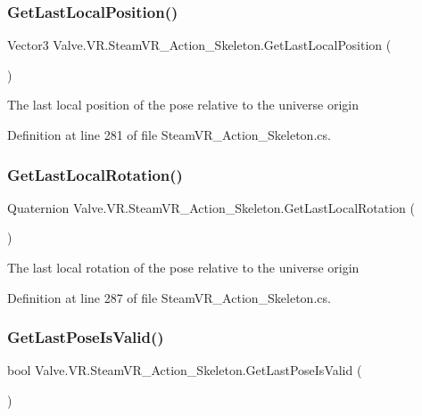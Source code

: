 \subsubsection{\texorpdfstring{GetLastLocalPosition()}{GetLastLocalPosition()}}
{\footnotesize\ttfamily Vector3 Valve.\+V\+R.\+Steam\+V\+R\+\_\+\+Action\+\_\+\+Skeleton.\+Get\+Last\+Local\+Position (\begin{DoxyParamCaption}{ }\end{DoxyParamCaption})}



The last local position of the pose relative to the universe origin 



Definition at line 281 of file Steam\+V\+R\+\_\+\+Action\+\_\+\+Skeleton.\+cs.

\mbox{\label{class_valve_1_1_v_r_1_1_steam_v_r___action___skeleton_a5b09f26524ff16abff9054915676207d}} 
\subsubsection{\texorpdfstring{GetLastLocalRotation()}{GetLastLocalRotation()}}
{\footnotesize\ttfamily Quaternion Valve.\+V\+R.\+Steam\+V\+R\+\_\+\+Action\+\_\+\+Skeleton.\+Get\+Last\+Local\+Rotation (\begin{DoxyParamCaption}{ }\end{DoxyParamCaption})}



The last local rotation of the pose relative to the universe origin 



Definition at line 287 of file Steam\+V\+R\+\_\+\+Action\+\_\+\+Skeleton.\+cs.

\mbox{\label{class_valve_1_1_v_r_1_1_steam_v_r___action___skeleton_a748a0907d02ce3413edc7e656272aca2}} 
\subsubsection{\texorpdfstring{GetLastPoseIsValid()}{GetLastPoseIsValid()}}
{\footnotesize\ttfamily bool Valve.\+V\+R.\+Steam\+V\+R\+\_\+\+Action\+\_\+\+Skeleton.\+Get\+Last\+Pose\+Is\+Valid (\begin{DoxyParamCaption}{ }\end{DoxyParamCaption})}



